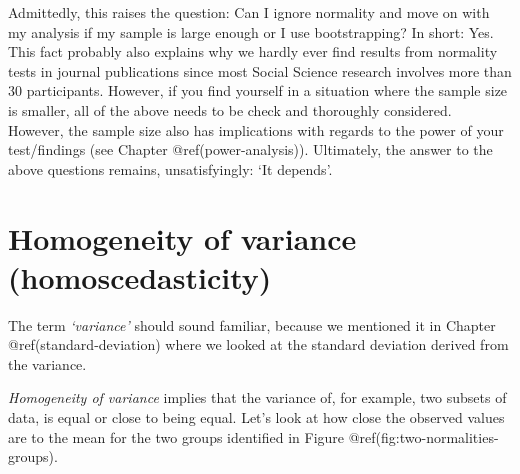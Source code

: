 \documentclass[
  letterpaper,
]{krantz}
\makeatletter
\newenvironment{Shaded}{\begin{snugshade}}{\end{snugshade}}
\newcommand{\AttributeTok}[1]{\textcolor[rgb]{0.40,0.45,0.13}{#1}}
\newcommand{\DecValTok}[1]{\textcolor[rgb]{0.68,0.00,0.00}{#1}}
\newcommand{\FloatTok}[1]{\textcolor[rgb]{0.68,0.00,0.00}{#1}}
\newcommand{\FunctionTok}[1]{\textcolor[rgb]{0.28,0.35,0.67}{#1}}
\newcommand{\NormalTok}[1]{\textcolor[rgb]{0.00,0.23,0.31}{#1}}
\newcommand{\SpecialCharTok}[1]{\textcolor[rgb]{0.37,0.37,0.37}{#1}}
\newcommand{\StringTok}[1]{\textcolor[rgb]{0.13,0.47,0.30}{#1}}
\newenvironment{kframe}{%
\medskip{}
\setlength{\fboxsep}{.8em}
 \def\at@end@of@kframe{}%
 \ifinner\ifhmode%
  \def\at@end@of@kframe{\end{minipage}}%
  \begin{minipage}{\columnwidth}%
 \fi\fi%
 \def\FrameCommand##1{\hskip\@totalleftmargin \hskip-\fboxsep
 \colorbox{shadecolor}{##1}\hskip-\fboxsep
     \hskip-\linewidth \hskip-\@totalleftmargin \hskip\columnwidth}%
 \MakeFramed {\advance\hsize-\width
   \@totalleftmargin\z@ \linewidth\hsize
   \@setminipage}}%
 {\par\unskip\endMakeFramed%
 \at@end@of@kframe}
\renewenvironment{Shaded}{\begin{kframe}}{\end{kframe}}
\makeatother
\begin{document}
Admittedly, this raises the question: Can I ignore normality and move on
with my analysis if my sample is large enough or I use bootstrapping? In
short: Yes. This fact probably also explains why we hardly ever find
results from normality tests in journal publications since most Social
Science research involves more than 30 participants. However, if you
find yourself in a situation where the sample size is smaller, all of
the above needs to be check and thoroughly considered. However, the
sample size also has implications with regards to the power of your
test/findings (see Chapter @ref(power-analysis)). Ultimately, the answer
to the above questions remains, unsatisfyingly: `It depends'.

\section{Homogeneity of variance
(homoscedasticity)}\label{sec-homogeneity-of-variance}

The term \emph{`variance'} should sound familiar, because we mentioned
it in Chapter @ref(standard-deviation) where we looked at the standard
deviation derived from the variance.

\emph{Homogeneity of variance} implies that the variance of, for
example, two subsets of data, is equal or close to being equal. Let's
look at how close the observed values are to the mean for the two groups
identified in Figure @ref(fig:two-normalities-groups).

\begin{Shaded}
\end{Shaded}
\end{document}
